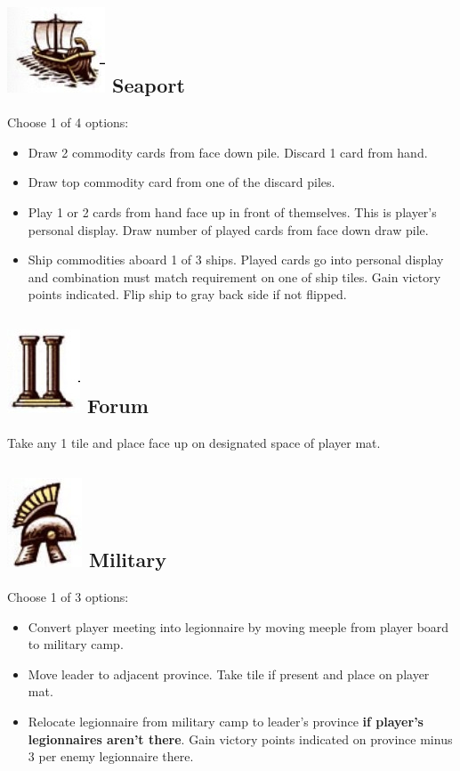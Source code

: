 \documentclass[10pt]{article}
\newenvironment{itemizeCustom}
{\begin{itemize}
  \setlength{\itemsep}{1pt}
  \setlength{\parskip}{0pt}
  \setlength{\parsep}{0pt}}
{\end{itemize}}
\begin{document}
\begin{multicols*}{2}
    \subsection*{\protect\includegraphics[scale=0.25]{images/seaport.jpg} Seaport}
    Choose 1 of 4 options:
    \begin{itemizeCustom}
        \item Draw 2 commodity cards from face down pile. Discard 1 card from hand.
        \item Draw top commodity card from one of the discard piles.
        \item Play 1 or 2 cards from hand face up in front of themselves. This is player's personal display. Draw number of played cards from face down draw pile.
        \item Ship commodities aboard 1 of 3 ships. Played cards go into personal display and combination must match requirement on one of ship tiles. Gain victory points indicated. Flip ship to gray back side if not flipped.
    \end{itemizeCustom}
    
    \subsection*{\protect\includegraphics[scale=0.25]{images/forum.jpg} Forum}
    Take any 1 tile and place face up on designated space of player mat.

    \subsection*{\protect\includegraphics[scale=0.25]{images/military.jpg} Military}
    Choose 1 of 3 options:
    \begin{itemizeCustom}
        \item Convert player meeting into legionnaire by moving meeple from player board to military camp.
        \item Move leader to adjacent province. Take tile if present and place on player mat.
        \item Relocate legionnaire from military camp to leader's province \textbf{if player's legionnaires aren't there}. Gain victory points indicated on province minus 3 per enemy legionnaire there.


\end{itemizeCustom}
\end{multicols*}
\end{document}
